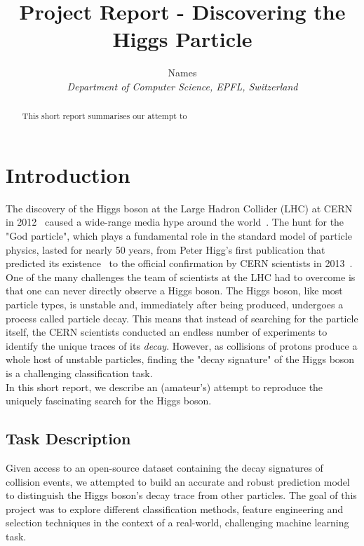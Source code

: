 \documentclass[10pt,conference,compsocconf]{IEEEtran}
\begin{document}
\title{Project Report - Discovering the Higgs Particle}

\author{
  Names\\
  \textit{Department of Computer Science, EPFL, Switzerland}
}

\maketitle

\begin{abstract}
This short report summarises our attempt to 
\end{abstract}


\section{Introduction}

The discovery of the Higgs boson at the Large Hadron Collider (LHC) at CERN in 2012~\cite{Aad2012} caused a wide-range media hype around the world~\cite{Guardian}. The hunt for the "God particle", which plays a fundamental role in the standard model of particle physics, lasted for nearly 50 years, from Peter Higg's first publication that predicted its existence~\cite{Higgs1964} to the official confirmation by CERN scientists in 2013~\cite{CERN}.\\
One of the many challenges the team of scientists at the LHC had to overcome is that one can never directly observe a Higgs boson. The Higgs boson, like most particle types, is unstable and, immediately after being produced, undergoes a process called particle decay. This means that instead of searching for the particle itself, the CERN scientists conducted an endless number of experiments to identify the unique traces of its \emph{decay}. However, as collisions of protons produce a whole host of unstable particles, finding the "decay signature" of the Higgs boson is a challenging classification task.\\
In this short report, we describe an (amateur's) attempt to reproduce the uniquely fascinating search for the Higgs boson.

\subsection{Task Description}
Given access to an open-source dataset containing the decay signatures of collision events, we attempted to build an accurate and robust prediction model to distinguish the Higgs boson's decay trace from other particles. The goal of this project was to explore different classification methods, feature engineering and selection techniques in the context of a real-world, challenging machine learning task. 
\end{document}
